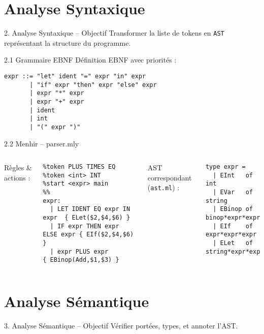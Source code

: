 \documentclass[aspectratio=43]{beamer}
\begin{document}
\section{Analyse Syntaxique}
\begin{frame}{2. Analyse Syntaxique – Objectif}
Transformer la liste de tokens en \texttt{AST} représentant la structure du programme.
\end{frame}

\begin{frame}[fragile]{2.1 Grammaire EBNF}
Définition EBNF avec priorités :
\begin{lstlisting}[style=ebnf]
expr ::= "let" ident "=" expr "in" expr
       | "if" expr "then" expr "else" expr
       | expr "*" expr
       | expr "+" expr
       | ident
       | int
       | "(" expr ")"
\end{lstlisting}
\end{frame}

\begin{frame}[fragile]{2.2 Menhir – parser.mly}
\begin{columns}
Règles & actions :
\begin{lstlisting}[style=ocaml]
%token LET IN IF THEN ELSE
%token PLUS TIMES EQ
%token <int> INT
%start <expr> main
%%
expr:
  | LET IDENT EQ expr IN expr  { ELet($2,$4,$6) }
  | IF expr THEN expr ELSE expr { EIf($2,$4,$6) }
  | expr PLUS expr             { EBinop(Add,$1,$3) }
\end{lstlisting}
AST correspondant (\texttt{ast.ml}) :
\begin{lstlisting}[style=ocaml]
type expr =
  | EInt   of int
  | EVar   of string
  | EBinop of binop*expr*expr
  | EIf    of expr*expr*expr
  | ELet   of string*expr*expr
\end{lstlisting}
\end{columns}
\end{frame}

\section{Analyse Sémantique}
\begin{frame}{3. Analyse Sémantique – Objectif}
Vérifier portées, types, et annoter l'AST.
\end{frame}
\end{document}
